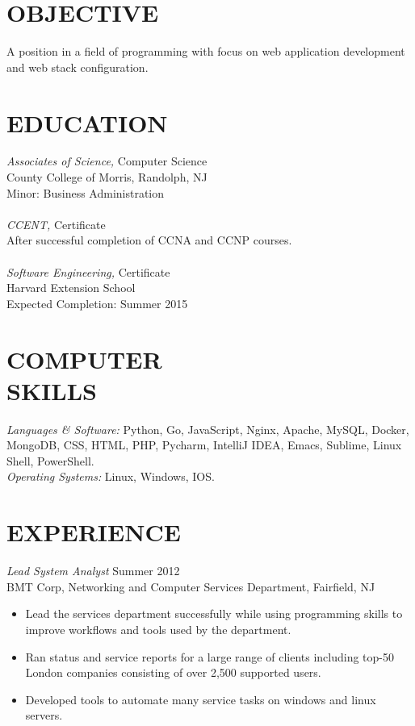 \documentclass[line,margin]{res}
\begin{document}
\address{265  Main Road, Montville, NJ 07045 - 862-345-8316}
\address{github.com/odonnellryan - odonnellryanc@gmail.com}

\begin{resume}

\section{OBJECTIVE}	A position in a field of programming with focus 
	on web application development and web stack configuration.
 
\section{EDUCATION} {\sl Associates of Science,} Computer Science \\
		County College of Morris, Randolph, NJ  \\
	 	Minor: Business Administration \\ \\
	{\sl CCENT,} Certificate \\
		After successful completion of CCNA and CCNP courses. \\ \\
	{\sl Software Engineering,} Certificate \\
		Harvard Extension School \\
		Expected Completion: Summer 2015

\section{COMPUTER \\ SKILLS} {\sl Languages \& Software:} Python, Go, JavaScript, 
	Nginx, Apache, MySQL, Docker, MongoDB, CSS, HTML, PHP,
	Pycharm, IntelliJ IDEA, Emacs, Sublime, Linux Shell, PowerShell. \\
	{\sl Operating Systems:} Linux, Windows, IOS.

\section{EXPERIENCE} {\sl Lead System Analyst} \hfill Summer 2012 \\
	BMT Corp, Networking and Computer Services Department, Fairfield, NJ
	\begin{itemize}  \itemsep -2pt
		\item Lead the services department successfully while using programming skills to improve
			workflows and tools used by the department. 
		\item Ran status and service reports for a large range of clients including top-50
			London companies consisting of over 2,500 supported users.
		\item   Developed tools to automate many service tasks on windows and linux servers.
	\end{itemize}


\end{resume}
\end{document}
